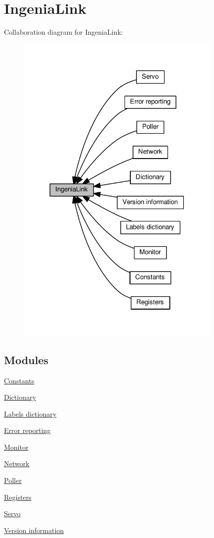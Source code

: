 \hypertarget{group__IL}{}\section{Ingenia\+Link}
\label{group__IL}
Collaboration diagram for Ingenia\+Link\+:\nopagebreak
\begin{figure}[H]
\begin{center}
\leavevmode
\includegraphics[width=283pt]{group__IL}
\end{center}
\end{figure}
\subsection*{Modules}
\begin{DoxyCompactItemize}
\item 
\hyperlink{group__IL__CONST}{Constants}
\item 
\hyperlink{group__IL__DICT}{Dictionary}
\item 
\hyperlink{group__IL__DICT__LABELS}{Labels dictionary}
\item 
\hyperlink{group__IL__ERR}{Error reporting}
\item 
\hyperlink{group__IL__MONITOR}{Monitor}
\item 
\hyperlink{group__IL__NET}{Network}
\item 
\hyperlink{group__IL__POLLER}{Poller}
\item 
\hyperlink{group__IL__REGS}{Registers}
\item 
\hyperlink{group__IL__SERVO}{Servo}
\item 
\hyperlink{group__IL__VERSION}{Version information}
\end{DoxyCompactItemize}
